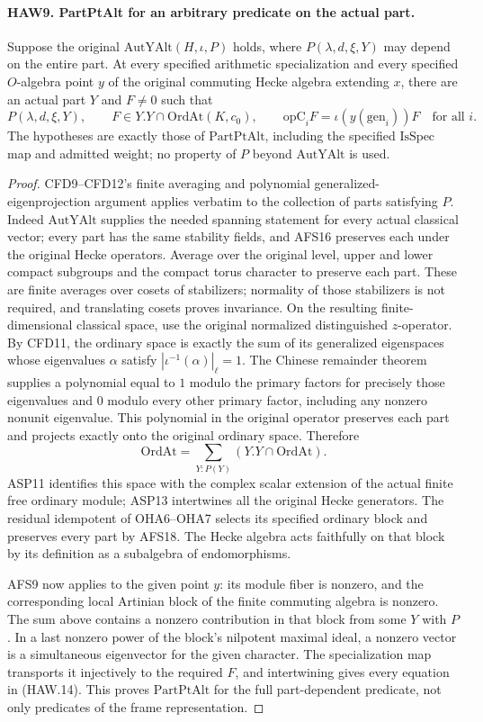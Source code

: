 \documentclass[11pt,a4paper]{article}
\numberwithin{equation}{section}
\theoremstyle{remark}\newtheorem{remark}[theorem]{Remark}
\begin{document}
\paragraph{HAW9. PartPtAlt for an arbitrary predicate on the actual part.}
\label{claim:HAW9}
Suppose the original $\mathrm{AutYAlt}(H,\iota,P)$ holds,
where $P(\lambda,d,\xi,Y)$ may depend on the entire part.
At every specified arithmetic specialization and every
specified $O$-algebra point $y$ of the original commuting
Hecke algebra extending $x$, there are an actual part $Y$
and $F\ne0$ such that
\[
 P(\lambda,d,\xi,Y),\qquad
 F\in Y.Y\cap\mathrm{OrdAt}(K,c_0),\qquad
 \mathrm{opC}_iF=\iota(y(\mathrm{gen}_i))F\quad\text{for all }i.
 \tag{HAW.14}
\]
The hypotheses are exactly those of $\mathrm{PartPtAlt}$,
including the specified $\mathrm{IsSpec}$ map and admitted
weight; no property of $P$ beyond $\mathrm{AutYAlt}$ is used.
\begin{proof}
CFD9--CFD12's finite averaging and polynomial generalized-eigenprojection
argument applies verbatim to the collection of parts satisfying
$P$.  Indeed $\mathrm{AutYAlt}$ supplies the needed spanning
statement for every actual classical vector; every part has
the same stability fields, and AFS16 preserves each under the
original Hecke operators.  Average over the original level,
upper and lower compact subgroups and the compact torus
character to preserve each part.  These are finite averages
over cosets of stabilizers; normality of those stabilizers is
not required, and translating cosets proves invariance.
On the resulting finite-dimensional classical space, use the
original normalized distinguished $z$-operator.  By CFD11,
the ordinary space is exactly the sum of its generalized
eigenspaces whose eigenvalues $\alpha$ satisfy
$|\iota^{-1}(\alpha)|_\ell=1$.  The Chinese remainder
theorem supplies a polynomial equal to $1$ modulo the
primary factors for precisely those eigenvalues and $0$
modulo every other primary factor, including any nonzero
nonunit eigenvalue.  This polynomial in the original
operator preserves each part and projects exactly onto
the original ordinary space.  Therefore
\[
       \mathrm{OrdAt}=\sum_{Y:P(Y)}(Y.Y\cap\mathrm{OrdAt}).
\]
ASP11 identifies this space with the complex scalar extension
of the actual finite free ordinary module; ASP13 intertwines
all the original Hecke generators.  The residual idempotent
of OHA6--OHA7 selects its specified ordinary block and
preserves every part by AFS18.  The Hecke algebra acts faithfully on
that block by its definition as a subalgebra of endomorphisms.

AFS9 now applies to the given point $y$: its module fiber is
nonzero, and the corresponding local Artinian block of the
finite commuting algebra is nonzero.  The sum above contains
a nonzero contribution in that block from some $Y$ with $P$.
In a last nonzero power of the block's nilpotent maximal
ideal, a nonzero vector is a simultaneous eigenvector for
the given character.  The specialization map transports it
injectively to the required $F$, and intertwining gives every
equation in (HAW.14).  This proves $\mathrm{PartPtAlt}$ for
the full part-dependent predicate, not only predicates of
the frame representation.
\end{proof}
\end{document}

